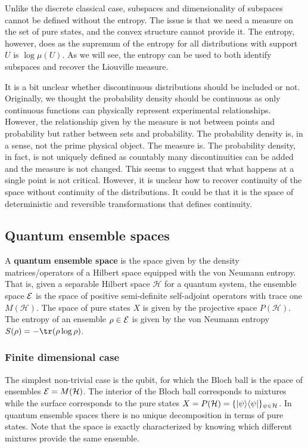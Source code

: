 Unlike the discrete classical case, subspaces and dimensionality of subspaces cannot be defined without the entropy. The issue is that we need a measure on the set of pure states, and the convex structure cannot provide it. The entropy, however, does as the supremum of the entropy for all distributions with support $U$ is $\log \mu(U)$. As we will see, the entropy can be used to both identify subspaces and recover the Liouville measure.

It is a bit unclear whether discontinuous distributions should be included or not. Originally, we thought the probability density should be continuous as only continuous functions can physically represent experimental relationships. However, the relationship given by the measure is not between points and probability but rather between sets and probability. The probability density is, in a sense, not the prime physical object. The measure is. The probability density, in fact, is not uniquely defined as countably many discontinuities can be added and the measure is not changed. This seems to suggest that what happens at a single point is not critical. However, it is unclear how to recover continuity of the space without continuity of the distributions. It could be that it is the space of deterministic and reversible transformations that defines continuity.

\subsection{Quantum ensemble spaces}

\begin{defn}
	A \textbf{quantum ensemble space} is the space given by the density matrices/operators of a Hilbert space equipped with the von Neumann entropy. That is, given a separable Hilbert space $\mathcal{H}$ for a quantum system, the ensemble space $\mathcal{E}$ is the space of positive semi-definite self-adjoint operators with trace one $M(\mathcal{H})$. The space of pure states $X$ is given by the projective space $P(\mathcal{H})$. The entropy of an ensemble $\rho \in \mathcal{E}$ is given by the von Neumann entropy $S(\rho) = -\tr(\rho \log \rho)$.
\end{defn}

\subsubsection{Finite dimensional case}

The simplest non-trivial case is the qubit, for which the Bloch ball is the space of ensembles $\mathcal{E} = M(\mathcal{H})$. The interior of the Bloch ball corresponds to mixtures  while the surface corresponds to the pure states $X = P(\mathcal{H}) = \{ |\psi\rangle \langle\psi| \}_{\psi \in \mathcal{H}}$. In quantum ensemble spaces there is no unique decomposition in terms of pure states. Note that the space is exactly characterized by knowing which different mixtures provide the same ensemble.

